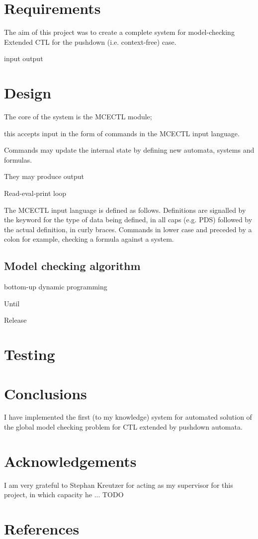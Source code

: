 \documentclass[11pt]{article}
\begin{document}
\section{Requirements}

The aim of this project was to create a complete system for model-checking Extended CTL for the pushdown (i.e. context-free) case. 

input
output



\section{Design}

The core of the system is the MCECTL module; 

this accepts input in the form of commands in the MCECTL input language. 

Commands may update the internal state by defining new automata, systems and formulas.

They may produce output


Read-eval-print loop


The MCECTL input language is defined as follows.
Definitions are signalled by the keyword for the type of data being defined, in all caps (e.g. PDS) followed by the actual definition, in curly braces.
Commands in lower case and preceded by a colon 
for example, checking a formula against a system.


\subsection{Model checking algorithm}

bottom-up
dynamic programming


Until

Release

\cite{EHRS00b}

\section{Testing}

\section{Conclusions}

I have implemented the first (to my knowledge) system for automated solution of
the global model checking problem for CTL extended by pushdown automata.

\section{Acknowledgements}

I am very grateful to Stephan Kreutzer for acting as my supervisor for this project, in which capacity he ... TODO


\section{References}
{}

\end{document}
